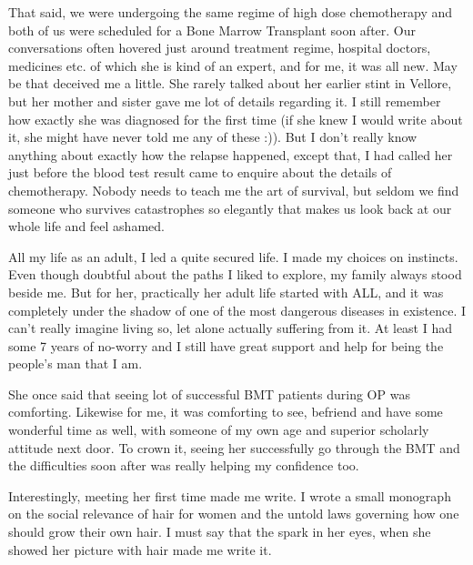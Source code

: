 That said, we were undergoing the same regime of high dose chemotherapy and both of us were scheduled for a Bone Marrow Transplant soon after. Our conversations often hovered just around treatment regime, hospital doctors, medicines etc. of which she is kind of an expert, and for me, it was all new. May be that deceived me a little. She rarely talked about her earlier stint in Vellore, but her mother and sister gave me lot of details regarding it. I still remember how exactly she was diagnosed for the first time (if she knew I would write about it, she might have never told me any of these :)). But I don't really know anything about exactly how the relapse happened, except that, I had called her just before the blood test result came to enquire about the details of chemotherapy. Nobody needs to teach me the art of survival, but seldom we find someone who survives catastrophes so elegantly that makes us look back at our whole life and feel ashamed.

All my life as an adult, I led a quite secured life. I made my choices on instincts. Even though doubtful about the paths I liked to explore, my family always stood beside me. But for her, practically her adult life started with ALL, and it was completely under the shadow of one of the most dangerous diseases in existence. I can't really imagine living so, let alone actually suffering from it. At least I had some 7 years of no-worry and I still have great support and help for being the people's man that I am.

She once said that seeing lot of successful BMT patients during OP was comforting. Likewise for me, it was comforting to see, befriend and have some wonderful time as well, with someone of my own age and superior scholarly attitude next door. To crown it, seeing her successfully go through the BMT and the difficulties soon after was really helping my confidence too.

Interestingly, meeting her first time made me write. I wrote a small monograph on the social relevance of hair for women and the untold laws governing how one should grow their own hair. I must say  that the spark in her eyes, when she showed her picture with hair made me write it.

\newpage     
